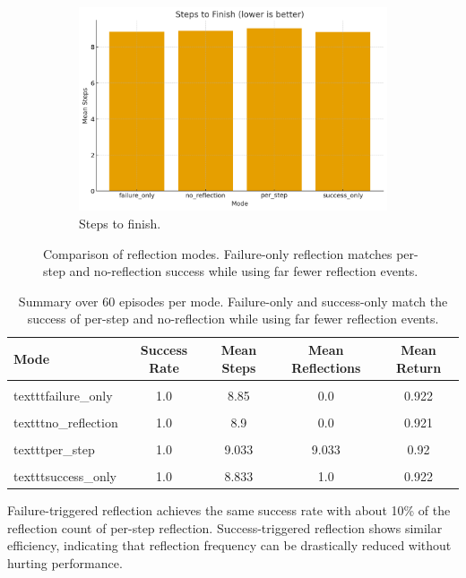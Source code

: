 \documentclass[conference]{IEEEtran}
\begin{document}
\begin{figure}[!t]
\begin{subfigure}{0.48\linewidth}
\includegraphics[width=\linewidth]{plots/reflection_timing_steps.png}
\caption{Steps to finish.}
\end{subfigure}
\caption{Comparison of reflection modes.
Failure-only reflection matches per-step and no-reflection success
while using far fewer reflection events.}
\label{fig:plots}
\end{figure}

\begin{table}[t]
\centering
\caption{Summary over 60 episodes per mode. Failure-only and success-only match the success of per-step and no-reflection while using far fewer reflection events.}
\label{tab:summary}
\begin{tabular}{lcccc}
\toprule
Mode & Success Rate & Mean Steps & Mean Reflections & Mean Return \\
\midrule
\\texttt{failure\_only} & 1.0 & 8.85 & 0.0 & 0.922 \\
\\texttt{no\_reflection} & 1.0 & 8.9 & 0.0 & 0.921 \\
\\texttt{per\_step} & 1.0 & 9.033 & 9.033 & 0.92 \\
\\texttt{success\_only} & 1.0 & 8.833 & 1.0 & 0.922 \\
\bottomrule
\end{tabular}
\end{table}


Failure-triggered reflection achieves the same success rate
with about 10\% of the reflection count of per-step reflection.
Success-triggered reflection shows similar efficiency,
indicating that reflection frequency can be drastically reduced
without hurting performance.
\end{document}
